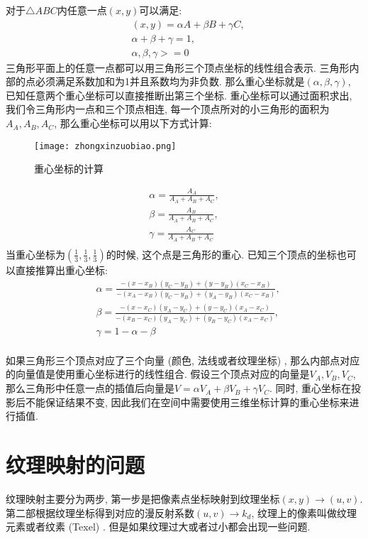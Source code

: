 对于$\triangle ABC$内任意一点$(x,y)$可以满足: 
\begin{equation}
	\begin{split}
		&(x,y) = \alpha A + \beta B + \gamma C, \\
		&\alpha + \beta + \gamma = 1,\\
		& \alpha, \beta, \gamma >= 0
	\end{split}
\end{equation}
三角形平面上的任意一点都可以用三角形三个顶点坐标的线性组合表示. 三角形内部的点必须满足系数加和为1并且系数均为非负数. 那么重心坐标就是$(\alpha,\beta,\gamma)$, 已知任意两个重心坐标可以直接推断出第三个坐标. 
重心坐标可以通过面积求出, 我们令三角形内一点和三个顶点相连, 每一个顶点所对的小三角形的面积为$A_A,A_B,A_C$, 那么重心坐标可以用以下方式计算: 
\begin{figure}[H]
	\centering
	\texttt{[image: zhongxinzuobiao.png]}
	\caption{重心坐标的计算}
	\label{fig:zongxinzuobiao}
\end{figure}
\begin{equation}
	\begin{split}
		\alpha = \frac{A_A}{A_A+A_B+A_C},\\
		\beta = \frac{A_B}{A_A+A_B+A_C},\\
		\gamma = \frac{A_C}{A_A+A_B+A_C}\\
	\end{split}
\end{equation}
当重心坐标为$(\frac{1}{3},\frac{1}{3},\frac{1}{3})$的时候, 这个点是三角形的重心. 已知三个顶点的坐标也可以直接推算出重心坐标: 
\begin{equation}
	\begin{split}
		&\alpha = \frac{-(x-x_B)(y_C-y_B) + (y-y_B)(x_C-x_B)}{-(x_A-x_B)(y_C-y_B) + (y_A-y_B)(x_C-x_B)},\\
		&\beta =  \frac{-(x-x_C)(y_A-y_C) + (y-y_C)(x_A-x_C)}{-(x_B-x_C)(y_A-y_C) + (y_B-y_C)(x_A-x_C)},\\
		&\gamma = 1-\alpha-\beta\\
	\end{split}
\end{equation}

如果三角形三个顶点对应了三个向量 (颜色, 法线或者纹理坐标) , 那么内部点对应的向量值是使用重心坐标进行的线性组合. 假设三个顶点对应的向量是$V_A,V_B,V_C$, 那么三角形中任意一点的插值后向量是$V=\alpha V_A +\beta V_B+\gamma V_C$. 同时, 重心坐标在投影后不能保证结果不变, 因此我们在空间中需要使用三维坐标计算的重心坐标来进行插值. 

\section{纹理映射的问题}
纹理映射主要分为两步, 第一步是把像素点坐标映射到纹理坐标$(x,y)\rightarrow (u,v)$. 第二部根据纹理坐标得到对应的漫反射系数$(u,v)\rightarrow k_d$, 纹理上的像素叫做纹理元素或者纹素 (Texel) . 但是如果纹理过大或者过小都会出现一些问题. 

